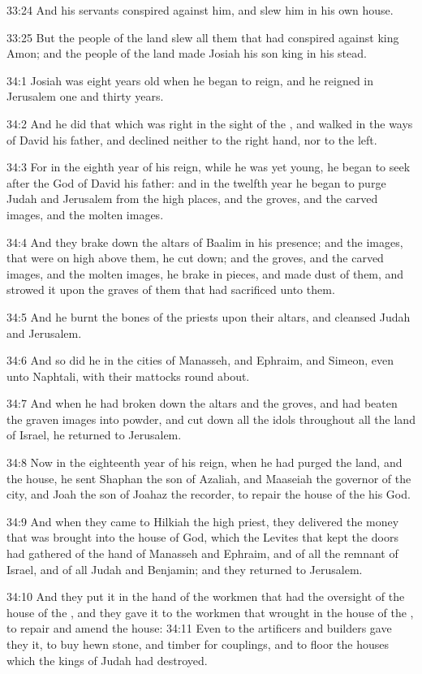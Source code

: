 33:24 And his servants conspired against him, and slew him in his own house.

33:25 But the people of the land slew all them that had conspired against king Amon; and the people of the land made Josiah his son king in his stead.

34:1 Josiah was eight years old when he began to reign, and he reigned in Jerusalem one and thirty years.

34:2 And he did that which was right in the sight of the \LORD, and walked in the ways of David his father, and declined neither to the right hand, nor to the left.

34:3 For in the eighth year of his reign, while he was yet young, he began to seek after the God of David his father: and in the twelfth year he began to purge Judah and Jerusalem from the high places, and the groves, and the carved images, and the molten images.

34:4 And they brake down the altars of Baalim in his presence; and the images, that were on high above them, he cut down; and the groves, and the carved images, and the molten images, he brake in pieces, and made dust of them, and strowed it upon the graves of them that had sacrificed unto them.

34:5 And he burnt the bones of the priests upon their altars, and cleansed Judah and Jerusalem.

34:6 And so did he in the cities of Manasseh, and Ephraim, and Simeon, even unto Naphtali, with their mattocks round about.

34:7 And when he had broken down the altars and the groves, and had beaten the graven images into powder, and cut down all the idols throughout all the land of Israel, he returned to Jerusalem.

34:8 Now in the eighteenth year of his reign, when he had purged the land, and the house, he sent Shaphan the son of Azaliah, and Maaseiah the governor of the city, and Joah the son of Joahaz the recorder, to repair the house of the \LORD his God.

34:9 And when they came to Hilkiah the high priest, they delivered the money that was brought into the house of God, which the Levites that kept the doors had gathered of the hand of Manasseh and Ephraim, and of all the remnant of Israel, and of all Judah and Benjamin; and they returned to Jerusalem.

34:10 And they put it in the hand of the workmen that had the oversight of the house of the \LORD, and they gave it to the workmen that wrought in the house of the \LORD, to repair and amend the house: 34:11 Even to the artificers and builders gave they it, to buy hewn stone, and timber for couplings, and to floor the houses which the kings of Judah had destroyed.

